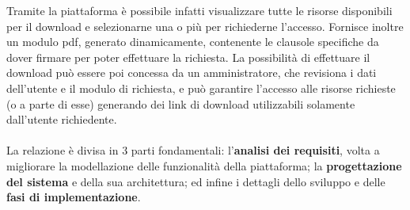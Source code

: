 Tramite la piattaforma è possibile infatti visualizzare tutte le risorse
disponibili per il download e selezionarne una o più per richiederne l'accesso.
Fornisce inoltre un modulo pdf, generato dinamicamente, contenente le clausole
specifiche da dover firmare per poter effettuare la richiesta. La possibilità di
effettuare il download può essere poi concessa da un amministratore, che revisiona
i dati dell'utente e il modulo di richiesta, e può garantire l'accesso alle risorse
richieste (o a parte di esse) generando dei link di download utilizzabili
solamente dall'utente richiedente.

\paragraph{}
La relazione è divisa in 3 parti fondamentali: l'\textbf{analisi dei requisiti},
volta a migliorare la modellazione delle funzionalità della piattaforma; la
\textbf{progettazione del sistema} e della sua architettura; ed infine i dettagli
dello sviluppo e delle \textbf{fasi di implementazione}.